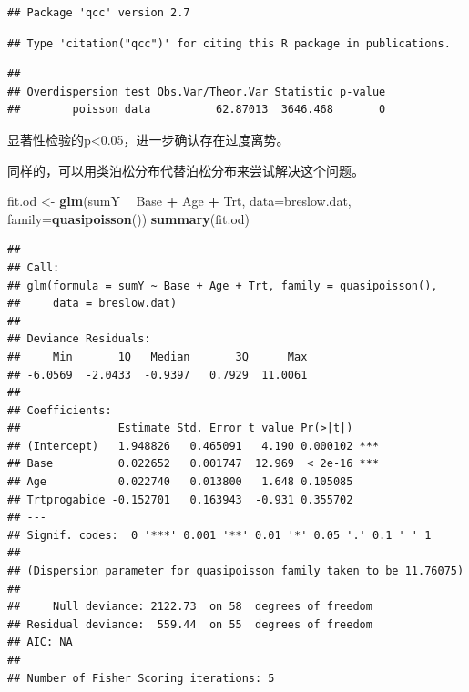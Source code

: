 \documentclass[
]{article}
\newenvironment{Shaded}{\begin{snugshade}}{\end{snugshade}}
\newcommand{\CommentTok}[1]{\textcolor[rgb]{0.56,0.35,0.01}{\textit{#1}}}
\newcommand{\DataTypeTok}[1]{\textcolor[rgb]{0.13,0.29,0.53}{#1}}
\newcommand{\KeywordTok}[1]{\textcolor[rgb]{0.13,0.29,0.53}{\textbf{#1}}}
\newcommand{\NormalTok}[1]{#1}
\newcommand{\OperatorTok}[1]{\textcolor[rgb]{0.81,0.36,0.00}{\textbf{#1}}}
\newcommand{\StringTok}[1]{\textcolor[rgb]{0.31,0.60,0.02}{#1}}
\begin{document}
\begin{verbatim}
## Package 'qcc' version 2.7
\end{verbatim}

\begin{verbatim}
## Type 'citation("qcc")' for citing this R package in publications.
\end{verbatim}

\begin{Shaded}
\end{Shaded}

\begin{verbatim}
##                    
## Overdispersion test Obs.Var/Theor.Var Statistic p-value
##        poisson data          62.87013  3646.468       0
\end{verbatim}

显著性检验的p\textless0.05，进一步确认存在过度离势。

同样的，可以用类泊松分布代替泊松分布来尝试解决这个问题。

\begin{Shaded}
\begin{Highlighting}[]
\NormalTok{fit.od <-}\StringTok{ }\KeywordTok{glm}\NormalTok{(sumY }\OperatorTok{~}\StringTok{ }\NormalTok{Base }\OperatorTok{+}\StringTok{ }\NormalTok{Age }\OperatorTok{+}\StringTok{ }\NormalTok{Trt, }
              \DataTypeTok{data=}\NormalTok{breslow.dat,}
              \DataTypeTok{family=}\KeywordTok{quasipoisson}\NormalTok{())}
\KeywordTok{summary}\NormalTok{(fit.od)}
\end{Highlighting}
\end{Shaded}

\begin{verbatim}
## 
## Call:
## glm(formula = sumY ~ Base + Age + Trt, family = quasipoisson(), 
##     data = breslow.dat)
## 
## Deviance Residuals: 
##     Min       1Q   Median       3Q      Max  
## -6.0569  -2.0433  -0.9397   0.7929  11.0061  
## 
## Coefficients:
##               Estimate Std. Error t value Pr(>|t|)    
## (Intercept)   1.948826   0.465091   4.190 0.000102 ***
## Base          0.022652   0.001747  12.969  < 2e-16 ***
## Age           0.022740   0.013800   1.648 0.105085    
## Trtprogabide -0.152701   0.163943  -0.931 0.355702    
## ---
## Signif. codes:  0 '***' 0.001 '**' 0.01 '*' 0.05 '.' 0.1 ' ' 1
## 
## (Dispersion parameter for quasipoisson family taken to be 11.76075)
## 
##     Null deviance: 2122.73  on 58  degrees of freedom
## Residual deviance:  559.44  on 55  degrees of freedom
## AIC: NA
## 
## Number of Fisher Scoring iterations: 5
\end{verbatim}
\end{document}
